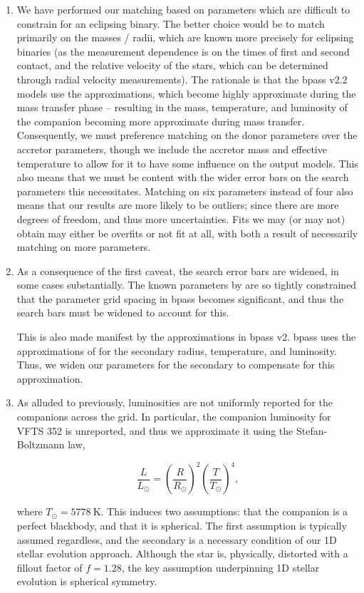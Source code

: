 \begin{enumerate}
    \item We have performed our matching based on parameters which are difficult to constrain for an eclipsing binary. The better choice would be to match primarily on the masses / radii, which are known more precisely for eclipsing binaries (as the measurement dependence is on the times of first and second contact, and the relative velocity of the stars, which can be determined through radial velocity measurements). The rationale is that the \gls{bpass} v2.2 models use the \citet{Hurley:2000} approximations, which become highly approximate during the mass transfer phase -- resulting in the mass, temperature, and luminosity of the companion becoming more approximate during mass transfer. Consequently, we must preference matching on the donor parameters over the accretor parameters, though we include the accretor mass and effective temperature to allow for it to have some influence on the output models. This also means that we must be content with the wider error bars on the search parameters this necessitates. Matching on six parameters instead of four also means that our results are more likely to be outliers; since there are more degrees of freedom, and thus more uncertainties. Fits we may (or may not) obtain may either be overfits or not fit at all, with both a result of necessarily matching on more parameters.

    \item As a consequence of the first caveat, the search error bars are widened, in some cases substantially. The known parameters by \citet{Abdul-masih:2022} are so tightly constrained that the parameter grid spacing in \gls{bpass} becomes significant, and thus the search bars must be widened to account for this.

    This is also made manifest by the approximations in \gls{bpass} v2. \gls{bpass} uses the approximations of \citet{Hurley:2000} for the secondary radius, temperature, and luminosity. Thus, we widen our parameters for the secondary to compensate for this approximation.

    \item As alluded to previously, luminosities are not uniformly reported for the companions across the grid. In particular, the companion luminosity for VFTS 352 is unreported, and thus we approximate it using the Stefan-Boltzmann law,

    \begin{equation}
        \frac{L}{L_\odot} = \left(\frac{R}{R_\odot}\right)^2 \left(\frac{T}{T_\odot}\right)^4,\label{eq:sb_law}
    \end{equation}

    where $T_\odot=\SI{5778}{\kelvin}$. This induces two assumptions: that the companion is a perfect blackbody, and that it is spherical. The first assumption is typically assumed regardless, and the secondary is a necessary condition of our 1D stellar evolution approach. Although the star is, physically, distorted with a fillout factor of $f=1.28$, the key assumption underpinning 1D stellar evolution is spherical symmetry.
\end{enumerate}

